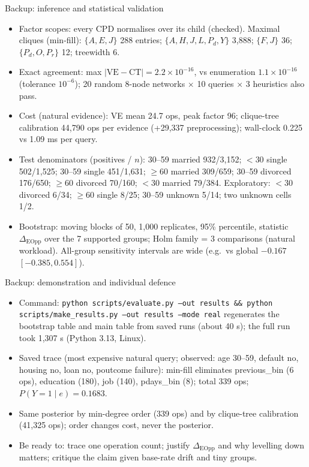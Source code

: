\documentclass[aspectratio=169,11pt]{beamer}
\begin{document}
\begin{frame}{Backup: inference and statistical validation}
\footnotesize
\begin{itemize}
\item Factor scopes: every CPD normalises over its child (checked). Maximal cliques (min-fill): $\{A,E,J\}$ 288 entries; $\{A,H,J,L,P_d,Y\}$ 3,888; $\{F,J\}$ 36; $\{P_d,O,P_r\}$ 12; treewidth 6.
\item Exact agreement: max $|\mathrm{VE}-\mathrm{CT}|=2.2\times10^{-16}$, vs enumeration $1.1\times10^{-16}$ (tolerance $10^{-6}$); 20 random 8-node networks $\times$ 10 queries $\times$ 3 heuristics also pass.
\item Cost (natural evidence): VE mean 24.7 ops, peak factor 96; clique-tree calibration 44,790 ops per evidence (+29,337 preprocessing); wall-clock 0.225 vs 1.09 ms per query.
\item Test denominators (positives / $n$): 30--59 married 932/3,152; $<30$ single 502/1,525; 30--59 single 451/1,631; $\ge60$ married 309/659; 30--59 divorced 176/650; $\ge60$ divorced 70/160; $<30$ married 79/384. Exploratory: $<30$ divorced 6/34; $\ge60$ single 8/25; 30--59 unknown 5/14; two unknown cells 1/2.
\item Bootstrap: moving blocks of 50, 1,000 replicates, 95\% percentile, statistic $\Delta_{\mathrm{EOpp}}$ over the 7 supported groups; Holm family = 3 comparisons (natural workload). All-group sensitivity intervals are wide (e.g.\ vs global $-0.167$ $[-0.385,0.554]$).
\end{itemize}
\end{frame}
\begin{frame}{Backup: demonstration and individual defence}
\small
\begin{itemize}
\item Command: \texttt{python scripts/evaluate.py --out results \&\& python scripts/make\_results.py --out results --mode real} regenerates the bootstrap table and main table from saved runs (about 40 s); the full run took 1,307 s (Python 3.13, Linux).
\item Saved trace (most expensive natural query; observed: age 30--59, default no, housing no, loan no, poutcome failure): min-fill eliminates previous\_bin (6 ops), education (180), job (140), pdays\_bin (8); total 339 ops; $P(Y{=}1\mid e)=0.1683$.
\item Same posterior by min-degree order (339 ops) and by clique-tree calibration (41,325 ops); order changes cost, never the posterior.
\item Be ready to: trace one operation count; justify $\Delta_{\mathrm{EOpp}}$ and why levelling down matters; critique the claim given base-rate drift and tiny groups.
\end{itemize}
\end{frame}
\end{document}

